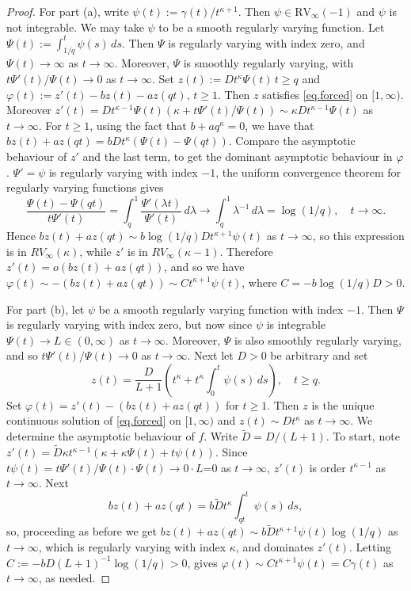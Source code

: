 \documentclass[10pt,a4paper]{amsart}
\begin{document}
	\begin{proof}
		For part (a), write $\psi(t):=\gamma(t)/t^{\kappa+1}$. Then $\psi\in \text{RV}_\infty(-1)$ and $\psi$ is not integrable. We may take $\psi$ to be a smooth regularly varying function. Let $\Psi(t):=\int_{1/q}^t \psi(s)\,ds$.
		Then $\Psi$ is regularly varying with index zero, and $\Psi(t)\to \infty$ as $t\to\infty$. Moreover, $\Psi$ is smoothly regularly varying, with $t\Psi'(t)/\Psi(t)\to 0$ as $t\to\infty$. Set $z(t):=Dt^\kappa \Psi(t)\,t\geq q$ and $\varphi(t):=z'(t)-bz(t)-az(qt), \,t\geq 1$. Then $z$ satisfies \eqref{eq.forced} on $[1,\infty)$. Moreover  
		$z'(t)=Dt^{\kappa-1}\Psi(t)(\kappa+t\Psi'(t)/\Psi(t))\sim \kappa Dt^{\kappa-1}\Psi(t)$ as $t\to\infty$. 	For $t\geq 1$, using the fact that $b+aq^\kappa=0$, we have that
		$bz(t)+az(qt) = bDt^\kappa(\Psi(t)-\Psi(qt))$. Compare the asymptotic behaviour of $z'$ and the last term, to get the dominant asymptotic behaviour in $\varphi$.  $\Psi'=\psi$ is regularly varying with index $-1$, the uniform convergence theorem for regularly varying functions gives 
		\[
		\frac{\Psi(t)-\Psi(qt)}{t\Psi'(t)}=\int_q^1 \frac{\Psi'(\lambda t)}{\Psi'(t)}\,d\lambda
		\to \int_q^1 \lambda^{-1}\,d\lambda = \log(1/q), \quad t\to\infty.
		\]
		Hence 
		$bz(t)+az(qt) \sim b \log(1/q) D t^{\kappa+1} \psi(t)$ as $t\to\infty$, 
		so this expression is in $RV_{\infty}(\kappa)$, while $z'$ is in $RV_{\infty}(\kappa-1)$. Therefore $z'(t)=o(bz(t)+az(qt))$, and so  we have
		$\varphi(t)\sim -(bz(t)+az(qt)) \sim C t^{\kappa+1} \psi(t)$, where $C=-b \log(1/q) D>0$.
		
		For part (b), let $\psi$ be a smooth regularly varying function with index $-1$. Then $\Psi$ is regularly varying with index zero, but now since $\psi$ is integrable $\Psi(t)\to L\in (0,\infty)$ as $t\to\infty$. Moreover, $\Psi$ is also smoothly regularly varying, and so $t\Psi'(t)/\Psi(t)\to 0$ as $t\to\infty$. Next let $D>0$ be arbitrary and set
		\[
		z(t)=\frac{D}{L+1}\left(t^\kappa + t^\kappa\int_0^t \psi(s)\,ds\right), \quad t\geq q.
		\]
		Set $\varphi(t)=z'(t)-(bz(t)+az(qt))$ for $t\geq 1$. Then $z$ is the unique continuous solution of \eqref{eq.forced} on $[1,\infty)$ and $z(t)\sim Dt^\kappa$ as $t\to\infty$. We determine the asymptotic behaviour of $f$. Write $\tilde{D}=D/(L+1)$. To start, note $z'(t)=\tilde{D}\kappa t^{\kappa-1}\left(\kappa+ \kappa \Psi(t) +  t\psi(t)\right)$. 
		Since $t\psi(t)=t\Psi'(t)/\Psi(t)\cdot \Psi(t)\to 0\cdot L$=0 as $t\to\infty$, $z'(t)$ is
		order $t^{\kappa-1}$ as $t\to\infty$. Next
		\[
		bz(t)+az(qt) = b\tilde{D} t^\kappa \int_{qt}^t \psi(s)\,ds,
		\]
		so, proceeding as before we get 
		$bz(t)+az(qt) \sim b \tilde{D}t^{\kappa+1} \psi(t)\log(1/q)$ as $t\to\infty$, which is regularly varying with index $\kappa$, and dominates $z'(t)$. Letting  $C:=-bD(L+1)^{-1}\log(1/q)>0$, gives  $\varphi(t)\sim C t^{\kappa+1} \psi(t)=C\gamma(t)$ as $t\to\infty$, as needed.  
	\end{proof}
\end{document}
